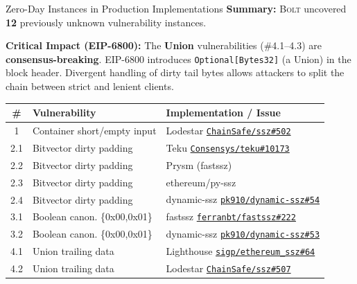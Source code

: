 \documentclass[aspectratio=169, 10pt, xcolor={table,dvipsnames}]{beamer}
\newcommand{\tool}{{\textsc{Bolt}}\xspace}
\begin{document}
\begin{frame}{Zero-Day Instances in Production Implementations}
    \small
    \textbf{Summary:} \tool{} uncovered \textbf{12} previously unknown vulnerability instances.
    
    \vspace{0.1cm}
    \textbf{Critical Impact (EIP-6800):} 
    The \textbf{Union} vulnerabilities (\#4.1--4.3) are \textbf{consensus-breaking}. EIP-6800 introduces \texttt{Optional[Bytes32]} (a Union) in the block header. Divergent handling of dirty tail bytes allows attackers to split the chain between strict and lenient clients.

    \vspace{0.2cm}
    \begin{table}
        \centering
        \scriptsize 
        \renewcommand{\arraystretch}{1.2}
        \setlength{\tabcolsep}{6pt}
        \begin{tabular}{c l l}
            \toprule
            \textbf{\#} & \textbf{Vulnerability} & \textbf{Implementation / Issue} \\
            \midrule
            1 & Container short/empty input & Lodestar \href{https://github.com/ChainSafe/ssz/issues/502}{\texttt{ChainSafe/ssz\#502}} \\
            2.1 & Bitvector dirty padding & Teku \href{https://github.com/Consensys/teku/pull/10173}{\texttt{Consensys/teku\#10173}} \\
            2.2 & Bitvector dirty padding & Prysm (fastssz) \\
            2.3 & Bitvector dirty padding & ethereum/py-ssz \\
            2.4 & Bitvector dirty padding & dynamic-ssz \href{https://github.com/pk910/dynamic-ssz/issues/54}{\texttt{pk910/dynamic-ssz\#54}} \\
            3.1 & Boolean canon. \{0x00,0x01\} & fastssz \href{https://github.com/ferranbt/fastssz/issues/222}{\texttt{ferranbt/fastssz\#222}} \\
            3.2 & Boolean canon. \{0x00,0x01\} & dynamic-ssz \href{https://github.com/pk910/dynamic-ssz/issues/53}{\texttt{pk910/dynamic-ssz\#53}} \\
            \hline
            \rowcolor{efred!15} 4.1 & Union trailing data & Lighthouse \href{https://github.com/sigp/ethereum_ssz/issues/64}{\texttt{sigp/ethereum\_ssz\#64}} \\
            \rowcolor{efred!15} 4.2 & Union trailing data & Lodestar \href{https://github.com/ChainSafe/ssz/issues/507}{\texttt{ChainSafe/ssz\#507}} \\

\end{tabular}
\end{table}
\end{frame}
\end{document}
